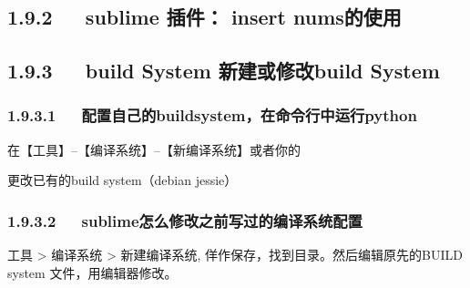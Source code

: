 \documentclass[letterpaper,12pt,english]{sphinxmanual}
\begin{document}
\subsection{1.9.2   sublime 插件： insert nums的使用}
\label{\detokenize{001software/001install/sublime:sublime-insert-nums}}

\subsection{1.9.3   build System 新建或修改build System}
\label{\detokenize{001software/001install/sublime:build-system-build-system}}

\subsubsection{1.9.3.1   配置自己的build\sphinxhyphen{}system，在命令行中运行python}
\label{\detokenize{001software/001install/sublime:build-system-python}}

在【工具】–【编译系统】–【新编译系统】或者你的 

更改已有的build system（debian jessie）



\subsubsection{1.9.3.2   sublime怎么修改之前写过的编译系统配置}
\label{\detokenize{001software/001install/sublime:id11}}

工具 \sphinxhyphen{}> 编译系统 \sphinxhyphen{}> 新建编译系统, 佯作保存，找到目录。然后编辑原先的BUILD system 文件，用编辑器修改。

\begin{sphinxVerbatim}[commandchars=\\\{\}]
\PYGZbs{}\PYGZbs{}\PYGZbs{}\PYGZbs{}\PYGZbs{}\PYGZbs{}
\end{sphinxVerbatim}
\end{document}
